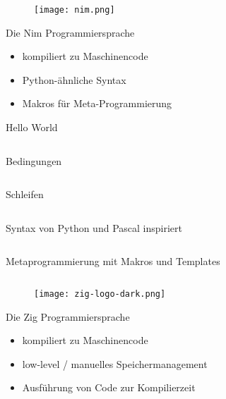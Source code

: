 \documentclass[aspectratio=169]{beamer}
\begin{document}
\begin{frame}{}
  \begin{figure}
    \centering
    \texttt{[image: nim.png]}
    \caption{\cite{nim_logo}}
    \label{fig:nim_logo}
  \end{figure}
\end{frame}

\begin{frame}{Die Nim Programmiersprache}
  \begin{itemize}
  \item kompiliert zu Maschinencode
  \item Python-ähnliche Syntax
  \item Makros für Meta-Programmierung
  \end{itemize}
\end{frame}

\begin{frame}{Hello World}
  \inputminted[linenos]{nim}{examples/hello.nim}
\end{frame}

\begin{frame}{Bedingungen}
  \inputminted[linenos]{nim}{examples/condition.nim}
\end{frame}

\begin{frame}{Schleifen}
  \inputminted[linenos]{nim}{examples/loops.nim}
\end{frame}

\begin{frame}{Syntax von Python und Pascal inspiriert}
  \inputminted[linenos]{nim}{examples/syntax.nim}
\end{frame}

\begin{frame}{Metaprogrammierung mit Makros und Templates}
  \inputminted[linenos]{nim}{examples/templates.nim}
\end{frame}

\begin{frame}{}
  \begin{figure}
    \centering
    \texttt{[image: zig-logo-dark.png]}
    \caption{\cite{zig_logo}}
    \label{fig:zig_logo}
  \end{figure}
\end{frame}

\begin{frame}{Die Zig Programmiersprache}
  \begin{itemize}
  \item kompiliert zu Maschinencode
  \item low-level / manuelles Speichermanagement
  \item Ausführung von Code zur Kompilierzeit
  \end{itemize}
\end{frame}
\end{document}
